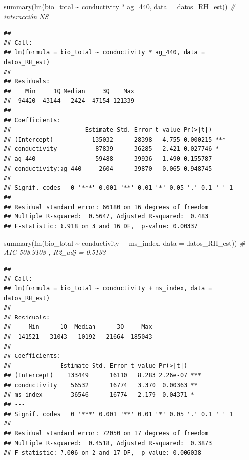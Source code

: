 \documentclass[
]{book}
\newenvironment{Shaded}{\begin{snugshade}}{\end{snugshade}}
\newcommand{\AttributeTok}[1]{\textcolor[rgb]{0.77,0.63,0.00}{#1}}
\newcommand{\CommentTok}[1]{\textcolor[rgb]{0.56,0.35,0.01}{\textit{#1}}}
\newcommand{\FunctionTok}[1]{\textcolor[rgb]{0.00,0.00,0.00}{#1}}
\newcommand{\NormalTok}[1]{#1}
\newcommand{\SpecialCharTok}[1]{\textcolor[rgb]{0.00,0.00,0.00}{#1}}
\begin{document}
\begin{Shaded}
\begin{Highlighting}[]
\FunctionTok{summary}\NormalTok{(}\FunctionTok{lm}\NormalTok{(bio\_total }\SpecialCharTok{\textasciitilde{}}\NormalTok{ conductivity }\SpecialCharTok{*}\NormalTok{ ag\_440, }\AttributeTok{data =}\NormalTok{ datos\_RH\_est)) }\CommentTok{\# interacción NS}
\end{Highlighting}
\end{Shaded}

\begin{verbatim}
## 
## Call:
## lm(formula = bio_total ~ conductivity * ag_440, data = datos_RH_est)
## 
## Residuals:
##    Min     1Q Median     3Q    Max 
## -94420 -43144  -2424  47154 121339 
## 
## Coefficients:
##                     Estimate Std. Error t value Pr(>|t|)    
## (Intercept)           135032      28398   4.755 0.000215 ***
## conductivity           87839      36285   2.421 0.027746 *  
## ag_440                -59488      39936  -1.490 0.155787    
## conductivity:ag_440    -2604      39870  -0.065 0.948745    
## ---
## Signif. codes:  0 '***' 0.001 '**' 0.01 '*' 0.05 '.' 0.1 ' ' 1
## 
## Residual standard error: 66180 on 16 degrees of freedom
## Multiple R-squared:  0.5647, Adjusted R-squared:  0.483 
## F-statistic: 6.918 on 3 and 16 DF,  p-value: 0.00337
\end{verbatim}

\begin{Shaded}
\begin{Highlighting}[]
\FunctionTok{summary}\NormalTok{(}\FunctionTok{lm}\NormalTok{(bio\_total }\SpecialCharTok{\textasciitilde{}}\NormalTok{ conductivity }\SpecialCharTok{+}\NormalTok{ ms\_index, }\AttributeTok{data =}\NormalTok{ datos\_RH\_est)) }\CommentTok{\# AIC 508.9108 , R2\_adj = 0.5133 }
\end{Highlighting}
\end{Shaded}

\begin{verbatim}
## 
## Call:
## lm(formula = bio_total ~ conductivity + ms_index, data = datos_RH_est)
## 
## Residuals:
##     Min      1Q  Median      3Q     Max 
## -141521  -31043  -10192   21664  185043 
## 
## Coefficients:
##              Estimate Std. Error t value Pr(>|t|)    
## (Intercept)    133449      16110   8.283 2.26e-07 ***
## conductivity    56532      16774   3.370  0.00363 ** 
## ms_index       -36546      16774  -2.179  0.04371 *  
## ---
## Signif. codes:  0 '***' 0.001 '**' 0.01 '*' 0.05 '.' 0.1 ' ' 1
## 
## Residual standard error: 72050 on 17 degrees of freedom
## Multiple R-squared:  0.4518, Adjusted R-squared:  0.3873 
## F-statistic: 7.006 on 2 and 17 DF,  p-value: 0.006038
\end{verbatim}
\end{document}
